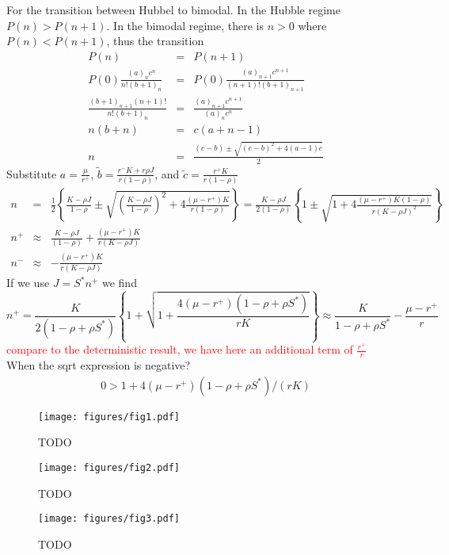 \documentclass[%
 amsmath,amssymb,
 reprint,%
]{revtex4-2}
\begin{document}
\begin{widetext}
  For the transition between Hubbel to bimodal. In the Hubble regime $P(n)>P(n+1)$. In the bimodal regime, there is $n>0$ where $P(n)<P(n+1)$, thus the transition 
  \begin{eqnarray}
      P(n)&=&P(n+1) \\
      P(0)\frac{(a)_n c^n}{n! (b+1)_n }&=&P(0) \frac{(a)_{n+1} c^{n+1}}{(n+1)! (b+1)_{n+1} } 
      \\
      \frac{(b+1)_{n+1}(n+1)!}{n! (b+1)_n }&=& \frac{(a)_{n+1} c^{n+1}}{(a)_n c^n } 
      \\
      n(b+n)&=& c (a+n-1) 
      \\
      n&=& \frac{(c-b)\pm \sqrt{(c-b)^2+4(a-1)c}}{2}
  \end{eqnarray}
Substitute $a=\frac{\mu}{r^+}$, $\tilde{b}= \frac{r^-K+r\rho J}{r(1-\rho)}$, and $\tilde{c}=\frac{r^+ K}{r(1-\rho)}$
\begin{eqnarray}
    n&=& \frac{1}{2}\left\{\frac{K-\rho J}{1-\rho} \pm \sqrt{\left(\frac{K-\rho J}{1-\rho}\right)^2+4\frac{(\mu-r^+) K}{r(1-\rho)}}\right\}=\frac{K-\rho J}{2(1-\rho)}\left\{1 \pm \sqrt{1+4\frac{(\mu-r^+) K(1-\rho)}{r(K-\rho J)^2}}\right\} \\
   n^+ &\approx&\frac{K-\rho J }{(1-\rho)} + \frac{(\mu-r^+) K }{r(K-\rho J)}
   \\
   n^- &\approx&- \frac{(\mu-r^+) K }{r(K-\rho J)}
\end{eqnarray}
If we use $J=S^* n^+$ we find
\begin{equation}
    n^+=\frac{K}{2(1-\rho+\rho S^*)}\left\{1+ \sqrt{1+\frac{4(\mu-r^+)(1-\rho+\rho S^*)}{rK}}\right\} \approx \frac{K}{1-\rho+\rho S^*}- \frac{\mu-r^+}{r}
\end{equation}
\textcolor{red}{ compare to the deterministic result, we have here an additional term of $\frac{r^+}{r}$}
\\
When the sqrt expression is negative? 
\begin{eqnarray}
    0>1+4(\mu-r^+) (1-\rho+\rho S^*)/(rK)
\end{eqnarray}

\end{widetext}



\begin{figure}[h]
\centering
\texttt{[image: figures/fig1.pdf]}
\caption{TODO}
\label{sample-fig1}
\end{figure}

\begin{figure}[h]
\centering
\texttt{[image: figures/fig2.pdf]}
\caption{TODO}
\label{sample-fig1}
\end{figure}

\begin{figure}[h]
\centering
\texttt{[image: figures/fig3.pdf]}
\caption{TODO}
\label{sample-fig1}
\end{figure}
\end{document}
